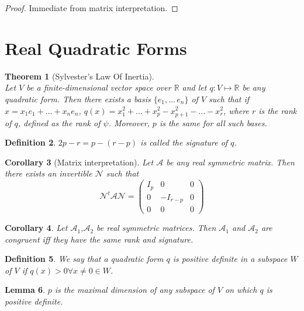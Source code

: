 \documentclass{notes}
\theoremstyle{plain}
\newtheorem{theorem}{Theorem}[chapter]
\newtheorem{corollary}[theorem]{Corollary}
\newtheorem{definition}[theorem]{Definition}
\newtheorem{lemma}[theorem]{Lemma}
\begin{document}
\begin{proof}
  Immediate from matrix interpretation.
\end{proof}

\section{Real Quadratic Forms}

\begin{theorem}[Sylvester's Law Of Inertia]\hfill\\
  Let $V$ be a finite-dimensional vector space over $\mathbb{R}$ and
  let $q \colon V \mapsto \mathbb{R}$ be any quadratic form.  Then there
  exists a basis $\{e_1,\dots\,e_n\}$ of $V$ such that if $x = x_1e_1
  + \dots + x_ne_n$, $q(x)=x_1^2+\dots + x_p^2 - x_{p+1}^2 - \dots -
  x_r^2$, where $r$ is the rank of $q$, defined as the rank of $\psi$.
  Moreover, $p$ is the same for all such bases.
\end{theorem}

\begin{definition}
  $2p-r = p - (r-p)$ is called the signature of $q$.
\end{definition}

\begin{corollary}[Matrix interpretation]
  Let $\mathcal{A}$ be any real symmetric matrix.  Then there exists
  an invertible $\mathcal{N}$ such that
\[
\mathcal{N}^t\mathcal{A}\mathcal{N} = \left(
\begin{matrix}
  I_p     & 0     & 0\\
  0       & -I_{r-p} &0      \\
  0 & 0 & 0
\end{matrix}
\right)
\]
\end{corollary} 

\begin{corollary}
  Let $\mathcal{A}_1$,$\mathcal{A}_2$ be real symmetric matrices.
  Then $\mathcal{A}_1$ and $\mathcal{A}_2$ are congruent iff they have
  the same rank and signature.
\end{corollary}

\begin{definition}
  We say that a quadratic form $q$ is positive definite in a subspace
  $W$ of $V$ if $q(x) > 0 \forall x \ne 0 \in W$.
\end{definition}

\begin{lemma}\label{lem:plem}
  $p$ is the maximal dimension of any subspace of $V$ on which $q$ is
  positive definite.
\end{lemma}
\end{document}
